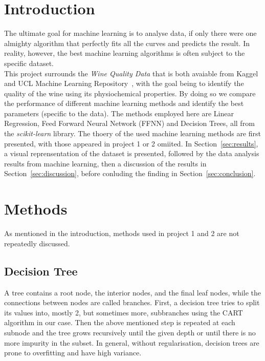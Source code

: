 \documentclass[english,notitlepage,reprint,nofootinbib]{revtex4-1}
\begin{document}
\section{Introduction}
The ultimate goal for machine learning is to analyse data, if only there were one almighty algorithm that perfectly fits all the curves and predicts the result. In reality, however, the best machine learning algorithms is often subject to the specific dataset. \\
This project surrounds the \textit{Wine Quality Data} \cite{CORTEZ2009547} that is both avaiable from Kaggel \cite{learning_2017} and UCL Machine Learning Repository~\cite{uci2009}, with the goal being to identify the quality of the wine using its physiochemical properties. By doing so we compare the performance of different machine learning methods and identify the best parameters (specific to the data). The methods employed here are Linear Regression, Feed Forward Neural Network (FFNN) and Decision Trees, all from the \textit{scikit-learn} library. The thoery of the used machine learning methods are first presented, with those appeared in project 1 or 2 omiited. In Section~\ref{sec:results}, a visual reprensentation of the dataset is presented, followed by the data analysis results from machine learning, then a discussion of the results in Section~\ref{sec:discussion}, before conluding the finding in Section~\ref{sec:conclusion}.

%

\section{Methods}\label{sec:methods}
%
As mentioned in the introduction, methods used in project 1 and 2 are not repeatedly discussed. 

\subsection{Decision Tree}
A tree contains a root node, the interior nodes, and the final leaf nodes, while the connections between nodes are called branches. First, a decision tree tries to split its values into, mostly 2, but sometimes more, subbranches using the CART algorithm in our case. Then the above mentioned step is repeated at each subnode and the tree grows recursively until the given depth or until there is no more impurity in the subset. In general, without regularisation, decision trees are prone to overfitting and have high variance.
\end{document}
